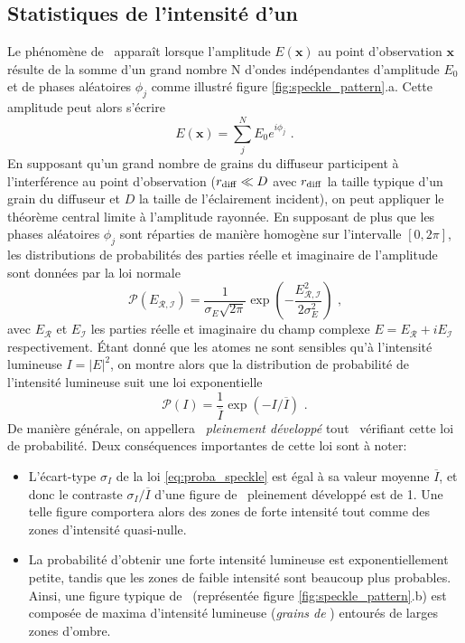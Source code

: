 \subsection{Statistiques de l'intensité d'un \speckle}
\label{sc:distribution_speckle}
Le phénomène de \speckle\ apparaît lorsque l'amplitude $E(\mathbf{x})$ au point d'observation $\mathbf{x}$ résulte de la somme d'un grand nombre N d'ondes indépendantes d'amplitude $E_0$ et de phases aléatoires $\phi_j$ comme illustré figure \ref{fig:speckle_pattern}.a. Cette amplitude peut alors s'écrire
\begin{equation}
E(\mathbf{x})=\sum_{j}^{N} E_0 e^{i \phi_j} \text{ .}
\end{equation}
En supposant qu'un grand nombre de grains du diffuseur participent à l'interférence au point d'observation ($r_{\mathrm{diff}} \ll D$ avec $r_{\mathrm{diff}}$ la taille typique d'un grain du diffuseur et $D$ la taille de l'éclairement incident), on peut appliquer le théorème central limite à l'amplitude rayonnée. En supposant de plus que les phases aléatoires $\phi_j$ sont réparties de manière homogène sur l'intervalle $\left[ 0,2\pi \right]$, les distributions de probabilités des parties réelle et imaginaire de l'amplitude sont données par la loi normale
\begin{equation}
\mathcal{P}(E_{\mathcal{R,I}})=\frac{1}{\sigma_E\sqrt{2\pi}} \exp{\left( -\frac{E_{\mathcal{R,I}}^2}{2 \sigma_E^2}\right) } \text{ ,}
\end{equation}
avec $E_{\mathcal{R}}$ et $E_{\mathcal{I}}$ les parties réelle et imaginaire du champ complexe $E=E_{\mathcal{R}} +i E_{\mathcal{I}}$ respectivement. Étant donné que les atomes ne sont sensibles qu'à l'intensité lumineuse $I=\left| E \right| ^2$, on montre alors que la distribution de probabilité de l'intensité lumineuse suit une loi exponentielle \citep{goodman2007speckle}
\begin{equation}
\mathcal{P}(I)=\frac{1}{\overline{I}}\exp{\left( -I/\overline{I} \right) } \text{ .}
\label{eq:proba_speckle}
\end{equation}
De manière générale, on appellera \emph{\speckle\ pleinement développé} tout \speckle\ vérifiant cette loi de probabilité. Deux conséquences importantes de cette loi sont à noter:
\begin{itemize}
\item[\textendash] L'écart-type $\sigma_I$ de la loi \ref{eq:proba_speckle} est égal à sa valeur moyenne $\overline{I}$, et donc le contraste $\sigma_I /\overline{I}$ d'une figure de \speckle\ pleinement développé est de 1. Une telle figure comportera alors des zones de forte intensité tout comme des zones d'intensité quasi-nulle. 
\item[\textendash] La probabilité d'obtenir une forte intensité lumineuse est exponentiellement petite, tandis que les zones de faible intensité sont beaucoup plus probables. Ainsi, une figure typique de \speckle\ (représentée figure \ref{fig:speckle_pattern}.b) est composée de maxima d'intensité lumineuse (\emph{grains de \speckle}) entourés de larges zones d'ombre.
\end{itemize}





